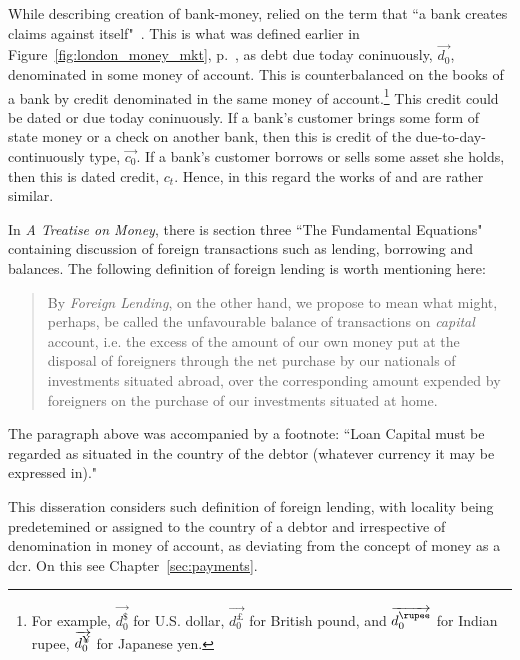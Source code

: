 While describing creation of bank-money, \citeauthor{keynes1971_1} relied on the term that ``a bank creates claims against itself"~\citep[p.~23]{keynes1930a}. This is what was defined earlier in Figure~\ref{fig:london_money_mkt}, p.~\pageref{fig:london_money_mkt}, as debt due today coninuously, $\overrightarrow{d_0}$, denominated in some money of account. This is counterbalanced on the books of a bank by credit denominated in the same money of account.\footnote{For example, $\overrightarrow{d^{\$}_0}$ for U.S. dollar, $\overrightarrow{d^{\pounds}_0}$ for British pound, and $\overrightarrow{d^{\text{\rupee}}_0}$ for Indian rupee, $\overrightarrow{d^{\text{\textyen}}_0}$ for Japanese yen.} This credit could be dated or due today coninuously. If a bank's customer brings some form of state money or a check on another bank, then this is credit of the due-to-day-continuously type, $\overrightarrow{c_0}$. If a bank's customer borrows or sells some asset she holds, then this is dated credit, $c_t$. Hence, in this regard the works of \citeauthor{keynes1930a} and \citeauthor{innes1913} are rather similar.

In \textit{A Treatise on Money}, there is section three ``The Fundamental Equations" containing discussion of foreign transactions such as lending, borrowing and balances. The following definition of foreign lending is worth mentioning here:

\begin{quote}
By \textit{Foreign Lending}, on the other hand, we propose to mean what might, perhaps, be called the unfavourable balance of transactions on \textit{capital} account, i.e. the excess of the amount of our own money put at the disposal of foreigners through the net purchase by our nationals of investments situated abroad, over the corresponding amount expended by foreigners on the purchase of our investments situated at home.~\citep[pp.~131-132, emphasis original]{keynes1930a}
\end{quote}

The paragraph above was accompanied by a footnote: ``Loan Capital must be regarded as situated in the country of the debtor (whatever currency it may be expressed in)."~\citep[p.~132]{keynes1930a} 

This disseration considers such definition of foreign lending, with locality being predetemined or assigned to the country of a debtor and irrespective of denomination in money of account, as deviating from the concept of money as a \acf{dcr}. On this see Chapter~\ref{sec:payments}.

